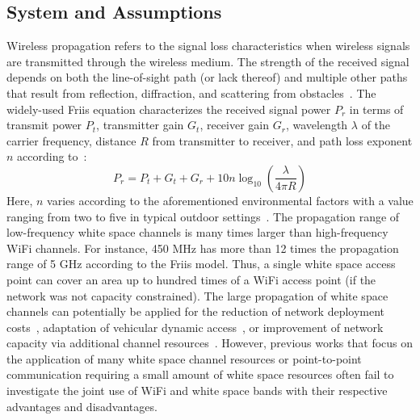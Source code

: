 \subsection{System and Assumptions}
\label{subsec:model}
Wireless propagation refers to the signal loss characteristics when wireless signals 
are transmitted through the wireless medium. The strength of the received signal depends on 
both the line-of-sight path (or lack thereof) and multiple other paths that result from reflection, 
diffraction, and scattering from obstacles~\cite{andersen1995propagation}. The widely-used Friis
equation characterizes the received signal power $P_r$ in terms of transmit power $P_t$, transmitter 
gain $G_t$, receiver gain $G_r$, wavelength $\lambda$ of the carrier frequency, distance $R$ from 
transmitter to receiver, and path loss exponent $n$ according to~\cite{friis}:
\begin{equation}
\label{eq:friis}
P_r=P_t+G_t+G_r+10n \log_{10}\left( \frac{\lambda}{4\pi R}\right)
\end{equation}
Here, $n$ varies according to the aforementioned environmental 
factors with a value ranging from two to five in typical outdoor 
settings~\cite{rappaport}.
The propagation range of low-frequency white space channels is many times larger than high-frequency WiFi channels. For instance, 
450 MHz has more than 12 times the propagation range of 5 GHz according to the Friis model. Thus, a 
single white space access point can cover an area up to hundred times of a WiFi access point (if the network was not capacity constrained). 
The large propagation of white space channels can potentially be applied for the reduction of network deployment 
costs~\cite{pcuiwinmee}, adaptation of vehicular dynamic access~\cite{chen2011feasibility}, or improvement 
of network capacity via additional channel resources~\cite{bahl2009white}.
However, previous works that focus on the application of many white space channel resources or point-to-point 
communication requiring a small amount of white space resources often fail to investigate the joint use of WiFi and white space bands with their respective advantages and disadvantages.

